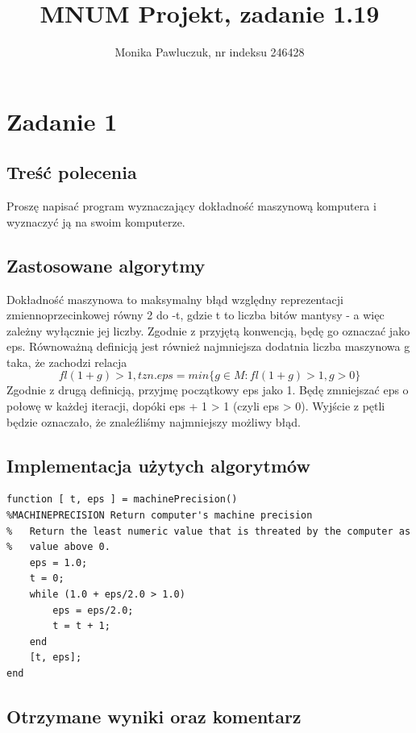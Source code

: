 \documentclass[11pt]{article} %
\title{MNUM Projekt, zadanie 1.19}
\author{Monika Pawluczuk, nr indeksu 246428}
\begin{document}
\maketitle

\section{Zadanie 1}

\subsection{Treść polecenia}

Proszę napisać program wyznaczający dokładność maszynową komputera i wyznaczyć ją na swoim komputerze.

\subsection{Zastosowane algorytmy}

Dokładność maszynowa to maksymalny błąd względny reprezentacji zmiennoprzecinkowej równy 2 do -t, gdzie t to liczba bitów mantysy - a więc zależny wyłącznie jej liczby. Zgodnie z przyjętą konwencją, będę go oznaczać jako eps.
Równoważną definicją jest również najmniejsza dodatnia liczba maszynowa g taka, że zachodzi relacja 
\begin{equation}
fl(1 + g) > 1, tzn. eps = min \{  g \in M : fl(1 + g) > 1, g > 0\}
\end{equation}
Zgodnie z drugą definicją, przyjmę początkowy eps jako 1. Będę zmniejszać eps o połowę w każdej iteracji, dopóki eps + 1 > 1 (czyli eps > 0). Wyjście z pętli będzie oznaczało, że znaleźliśmy najmniejszy możliwy błąd.

\subsection{Implementacja użytych algorytmów}

\begin{verbatim}
function [ t, eps ] = machinePrecision()
%MACHINEPRECISION Return computer's machine precision
%   Return the least numeric value that is threated by the computer as
%   value above 0.
    eps = 1.0;
    t = 0;
    while (1.0 + eps/2.0 > 1.0)
        eps = eps/2.0;
        t = t + 1;
    end
    [t, eps];
end

\end{verbatim}

\subsection{Otrzymane wyniki oraz komentarz}
\end{document}
